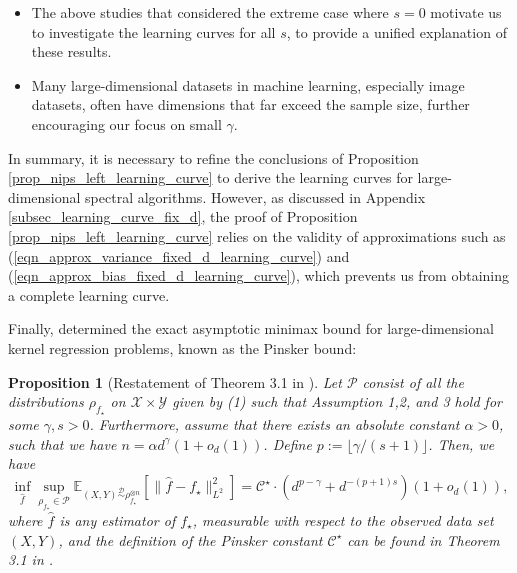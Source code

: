 \documentclass{article}
\theoremstyle{plain}
\newtheorem{proposition}[theorem]{Proposition}
\theoremstyle{definition}
\theoremstyle{remark}
\newcommand{\calC}{\mathcal{C}}
\begin{document}
\begin{appendix}
\begin{itemize}
    \item The above studies \cite{ghorbani2021linearized, Donhauser_how_2021, mei2022generalization, xiao2022precise, misiakiewicz_spectrum_2022, hu2022sharp} that considered the extreme case where $s=0$ motivate us to investigate the learning curves for all $s$, to provide a unified explanation of these results.

    \item Many large-dimensional datasets in machine learning, especially image datasets, often have dimensions that far exceed the sample size, further encouraging our focus on small $\gamma$. 
\end{itemize}
In summary, it is necessary to refine the conclusions of Proposition \ref{prop_nips_left_learning_curve} to derive the learning curves for large-dimensional spectral algorithms.
However, as discussed in Appendix \ref{subsec_learning_curve_fix_d}, the proof of Proposition \ref{prop_nips_left_learning_curve} relies on the validity of approximations such as (\ref{eqn_approx_variance_fixed_d_learning_curve}) and (\ref{eqn_approx_bias_fixed_d_learning_curve}), which prevents us from obtaining a complete learning curve.






Finally, \cite{lu2024pinsker} determined the exact asymptotic minimax bound for large-dimensional kernel regression problems, known as the Pinsker bound:



\begin{proposition}[Restatement of Theorem 3.1 in \cite{lu2024pinsker}]\label{prop_pinsker_constant}
    Let $\mathcal{P}$ consist of all the distributions $\rho_{f_{\star}}$ on $\mathcal{X} \times \mathcal{Y}$ given by (1) such that Assumption 
1,2, and 3 hold for some $\gamma, s>0$. 
Furthermore, assume that there exists an absolute constant $\alpha>0$, such that we have $n = \alpha d^{\gamma} (1+o_{d}(1))$. Define \(p := \lfloor \gamma/(s+1) \rfloor\).
Then, we have
    \begin{equation*}
        \inf_{\hat{f}} \sup_{
        \rho_{f_{\star}} \in \mathcal{P}} \mathbb{E}_{(X, Y) \overset{\mathcal{D}}{\sim} \rho_{f_{\star}}^{\otimes n}}\left[
    \|\hat{f}-f_{\star}\|_{L^2}^2
    \right]
    =
    \calC^{\star} \cdot \left( 
    d^{p-\gamma} + 
    d^{-(p+1)s}
    \right)(1+o_{d}(1)),
    \end{equation*}
    where $\hat{f}$ is any estimator of $f_{\star}$, measurable with respect to the observed data set $(X, Y)$, and the definition of the Pinsker constant $\calC^{\star}$ can be found in Theorem 3.1 in \cite{lu2024pinsker}.
\end{proposition}







\end{appendix}
\end{document}
